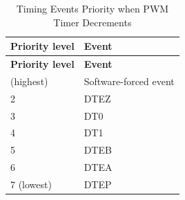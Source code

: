 \begin{longtable}[c]{|p{6cm}|p{6cm}|}
    \caption{Timing Events Priority when PWM Timer Decrements}
    \label{tab:mcpwm-evt-prio-d}
    \\\hline
    \rowcolor{lightgray}
    \textbf{Priority level}
    & \textbf{Event}
    \\\hline
    \endfirsthead
    \hline
    \rowcolor{lightgray}   
    \textbf{Priority level}
    & \textbf{Event}
    \\\hline
    \endhead
    \hline
    \endfoot
    1 (highest)
    & Software-forced event
    \\\hline
    2
    & DTEZ
    \\\hline
    3
    & DT0
    \\\hline
    4
    & DT1
    \\\hline
    5
    & DTEB
    \\\hline
    6
    & DTEA
    \\\hline
    7 (lowest)
    & DTEP
    \end{longtable}
